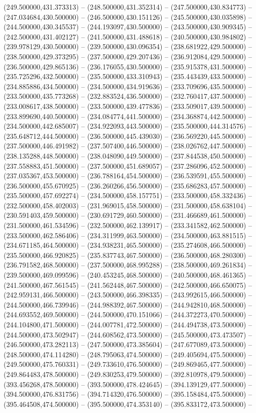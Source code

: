 (249.500000,431.373313) -- (248.500000,431.352314) -- (247.500000,430.834773) -- (247.034684,430.500000) -- (246.500000,430.151126) -- (245.500000,430.035898) -- (244.500000,430.345537) -- (244.193097,430.500000) -- (243.500000,430.909345) -- (242.500000,431.402127) -- (241.500000,431.488618) -- (240.500000,430.984802) -- (239.978129,430.500000) -- (239.500000,430.096354) -- (238.681922,429.500000) -- (238.500000,429.373295) -- (237.500000,429.207436) -- (236.912084,429.500000) -- (236.500000,429.865136) -- (236.176055,430.500000) -- (235.915378,431.500000) -- (235.725296,432.500000) -- (235.500000,433.310943) -- (235.443439,433.500000) -- (234.885886,434.500000) -- (234.500000,434.919636) -- (233.709696,435.500000) -- (233.500000,435.773268) -- (232.883524,436.500000) -- (232.760417,437.500000) -- (233.008617,438.500000) -- (233.500000,439.477836) -- (233.509017,439.500000) -- (233.899690,440.500000) -- (234.084774,441.500000) -- (234.368874,442.500000) -- (234.500000,442.685007) -- (234.922093,443.500000) -- (235.500000,444.314576) -- (235.648712,444.500000) -- (236.500000,445.439030) -- (236.569220,445.500000) -- (237.500000,446.491982) -- (237.507400,446.500000) -- (238.026762,447.500000) -- (238.135288,448.500000) -- (238.048090,449.500000) -- (237.844538,450.500000) -- (237.558883,451.500000) -- (237.500000,451.689057) -- (237.286096,452.500000) -- (237.035367,453.500000) -- (236.788164,454.500000) -- (236.539591,455.500000) -- (236.500000,455.670925) -- (236.260266,456.500000) -- (235.686283,457.500000) -- (235.500000,457.692274) -- (234.500000,458.157751) -- (233.500000,458.332436) -- (232.500000,458.402003) -- (231.969015,458.500000) -- (231.500000,458.638104) -- (230.591403,459.500000) -- (230.691729,460.500000) -- (231.466689,461.500000) -- (231.500000,461.534596) -- (232.500000,462.139917) -- (233.341582,462.500000) -- (233.500000,462.586406) -- (234.311999,463.500000) -- (234.500000,463.881515) -- (234.671185,464.500000) -- (234.938231,465.500000) -- (235.274608,466.500000) -- (235.500000,466.920825) -- (235.837743,467.500000) -- (236.500000,468.280300) -- (236.791582,468.500000) -- (237.500000,468.995288) -- (238.500000,469.261834) -- (239.500000,469.099596) -- (240.453245,468.500000) -- (240.500000,468.461365) -- (241.500000,467.561545) -- (241.562448,467.500000) -- (242.500000,466.650075) -- (242.959131,466.500000) -- (243.500000,466.398335) -- (243.992615,466.500000) -- (244.500000,466.739946) -- (244.988392,467.500000) -- (244.942810,468.500000) -- (244.693552,469.500000) -- (244.500000,470.151066) -- (244.372273,470.500000) -- (244.104800,471.500000) -- (244.007781,472.500000) -- (244.494738,473.500000) -- (244.500000,473.502947) -- (244.608562,473.500000) -- (245.500000,473.473507) -- (246.500000,473.282113) -- (247.500000,473.385604) -- (247.677089,473.500000) -- (248.500000,474.114280) -- (248.795063,474.500000) -- (249.405694,475.500000) -- (249.500000,475.760331) -- (249.733610,476.500000) -- (249.869465,477.500000) -- (249.864483,478.500000) -- (249.830253,479.500000) -- (392.810978,479.500000) -- (393.456268,478.500000) -- (393.500000,478.424645) -- (394.139129,477.500000) -- (394.500000,476.831756) -- (394.714320,476.500000) -- (395.158484,475.500000) -- (395.464508,474.500000) -- (395.500000,474.353140) -- (395.833172,473.500000) -- 